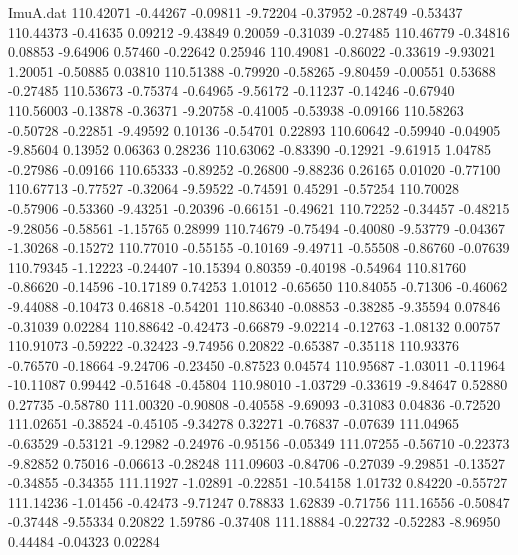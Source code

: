 \begin{filecontents}{ImuA.dat}
 110.42071   -0.44267   -0.09811   -9.72204   -0.37952   -0.28749   -0.53437
 110.44373   -0.41635    0.09212   -9.43849    0.20059   -0.31039   -0.27485
 110.46779   -0.34816    0.08853   -9.64906    0.57460   -0.22642    0.25946
 110.49081   -0.86022   -0.33619   -9.93021    1.20051   -0.50885    0.03810
 110.51388   -0.79920   -0.58265   -9.80459   -0.00551    0.53688   -0.27485
 110.53673   -0.75374   -0.64965   -9.56172   -0.11237   -0.14246   -0.67940
 110.56003   -0.13878   -0.36371   -9.20758   -0.41005   -0.53938   -0.09166
 110.58263   -0.50728   -0.22851   -9.49592    0.10136   -0.54701    0.22893
 110.60642   -0.59940   -0.04905   -9.85604    0.13952    0.06363    0.28236
 110.63062   -0.83390   -0.12921   -9.61915    1.04785   -0.27986   -0.09166
 110.65333   -0.89252   -0.26800   -9.88236    0.26165    0.01020   -0.77100
 110.67713   -0.77527   -0.32064   -9.59522   -0.74591    0.45291   -0.57254
 110.70028   -0.57906   -0.53360   -9.43251   -0.20396   -0.66151   -0.49621
 110.72252   -0.34457   -0.48215   -9.28056   -0.58561   -1.15765    0.28999
 110.74679   -0.75494   -0.40080   -9.53779   -0.04367   -1.30268   -0.15272
 110.77010   -0.55155   -0.10169   -9.49711   -0.55508   -0.86760   -0.07639
 110.79345   -1.12223   -0.24407  -10.15394    0.80359   -0.40198   -0.54964
 110.81760   -0.86620   -0.14596  -10.17189    0.74253    1.01012   -0.65650
 110.84055   -0.71306   -0.46062   -9.44088   -0.10473    0.46818   -0.54201
 110.86340   -0.08853   -0.38285   -9.35594    0.07846   -0.31039    0.02284
 110.88642   -0.42473   -0.66879   -9.02214   -0.12763   -1.08132    0.00757
 110.91073   -0.59222   -0.32423   -9.74956    0.20822   -0.65387   -0.35118
 110.93376   -0.76570   -0.18664   -9.24706   -0.23450   -0.87523    0.04574
 110.95687   -1.03011   -0.11964  -10.11087    0.99442   -0.51648   -0.45804
 110.98010   -1.03729   -0.33619   -9.84647    0.52880    0.27735   -0.58780
 111.00320   -0.90808   -0.40558   -9.69093   -0.31083    0.04836   -0.72520
 111.02651   -0.38524   -0.45105   -9.34278    0.32271   -0.76837   -0.07639
 111.04965   -0.63529   -0.53121   -9.12982   -0.24976   -0.95156   -0.05349
 111.07255   -0.56710   -0.22373   -9.82852    0.75016   -0.06613   -0.28248
 111.09603   -0.84706   -0.27039   -9.29851   -0.13527   -0.34855   -0.34355
 111.11927   -1.02891   -0.22851  -10.54158    1.01732    0.84220   -0.55727
 111.14236   -1.01456   -0.42473   -9.71247    0.78833    1.62839   -0.71756
 111.16556   -0.50847   -0.37448   -9.55334    0.20822    1.59786   -0.37408
 111.18884   -0.22732   -0.52283   -8.96950    0.44484   -0.04323    0.02284

\end{filecontents}
